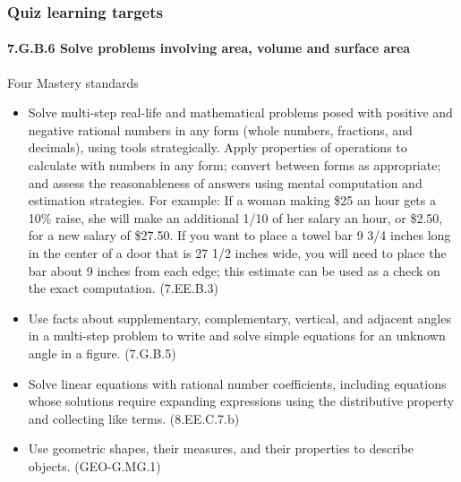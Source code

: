 \documentclass{beamer}
\begin{document}
\frame
{
  \frametitle{Quiz learning targets}
  \framesubtitle{7.G.B.6 Solve problems involving area, volume and surface area}

  \begin{block}{Four Mastery standards}
    \begin{itemize}
    \item Solve multi-step real-life and mathematical problems posed with positive and negative rational numbers in any form (whole numbers, fractions, and decimals), using tools strategically. Apply properties of operations to calculate with numbers in any form; convert between forms as appropriate; and assess the reasonableness of answers using mental computation and estimation strategies. For example: If a woman making \$25 an hour gets a 10\% raise, she will make an additional 1/10 of her salary an hour, or \$2.50, for a new salary of \$27.50. If you want to place a towel bar 9 3/4 inches long in the center of a door that is 27 1/2 inches wide, you will need to place the bar about 9 inches from each edge; this estimate can be used as a check on the exact computation. (7.EE.B.3)
        
    \item Use facts about supplementary, complementary, vertical, and adjacent angles in a multi-step problem to write and solve simple equations for an unknown angle in a figure. (7.G.B.5)
    
    \item Solve linear equations with rational number coefficients, including equations whose solutions require expanding expressions using the distributive property and collecting like terms. (8.EE.C.7.b)
    
    \item Use geometric shapes, their measures, and their properties to describe objects. (GEO-G.MG.1)
    \end{itemize}
  \end{block}
}
  
\end{document}
